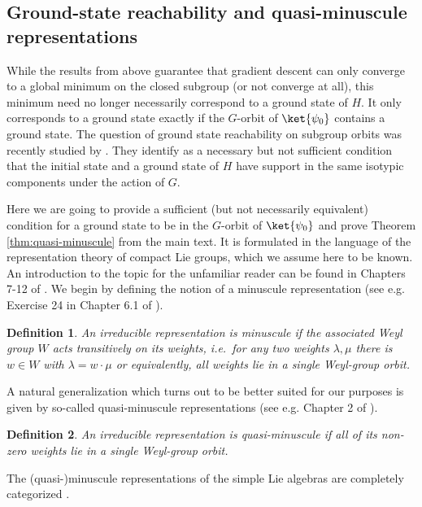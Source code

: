 \documentclass{article}
\newtheorem{definition}{Definition}
\begin{document}
\subsection{Ground-state reachability and quasi-minuscule representations}
\label{app:subgroup-reachability}

While the results from above guarantee that gradient descent can only converge to a global minimum on the closed subgroup (or not converge at all), this minimum need no longer necessarily correspond to a ground state of \(H\).
It only corresponds to a ground state exactly if the \(G\)-orbit of \(\ket{\psi_0}\) contains a ground state.
The question of ground state reachability on subgroup orbits was recently studied by \cite{singh_ground-state_2026}.
They identify as a necessary but not sufficient condition that the initial state and a ground state of \(H\) have support in the same isotypic components under the action of \(G\).

Here we are going to provide a sufficient (but not necessarily equivalent) condition for a ground state to be in the \(G\)-orbit of \(\ket{\psi_0}\) and prove Theorem \ref{thm:quasi-minuscule} from the main text.
It is formulated in the language of the representation theory of compact Lie groups, which we assume here to be known.
An introduction to the topic for the unfamiliar reader can be found in Chapters 7-12 of \cite{Hall15}.
We begin by defining the notion of a minuscule representation (see e.g. Exercise 24 in Chapter 6.1 of \cite{Bourb08a}).

\begin{definition}
An irreducible representation is \emph{minuscule} if the associated Weyl group $W$ acts transitively on its weights, i.e.\ for any two weights $\lambda,\mu$ there is $w\in W$ with $\lambda = w\cdot\mu$ or equivalently, all weights lie in a single Weyl-group orbit.
\end{definition}

A natural generalization which turns out to be better suited for our purposes is given by so-called quasi-minuscule representations (see e.g. Chapter 2 of \cite{lee_polytopes_2017}).

\begin{definition}
An irreducible representation is \emph{quasi-minuscule} if all of its \emph{non-zero} weights lie in a single Weyl-group orbit.
\end{definition}

The (quasi-)minuscule representations of the simple Lie algebras are completely categorized \cite{lee_polytopes_2017}.
\end{document}
